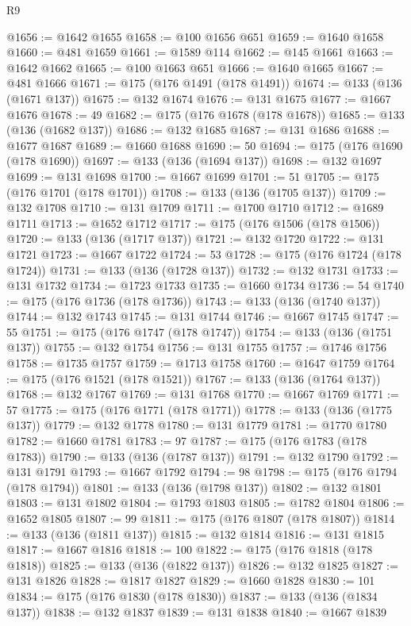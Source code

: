 \begin{lexlean}{R9}
\begin{coremodule}
@1656 := @1642 @1655
@1658 := @100 @1656 @651
@1659 := @1640 @1658
@1660 := @481 @1659
@1661 := @1589 @114
@1662 := @145 @1661
@1663 := @1642 @1662
@1665 := @100 @1663 @651
@1666 := @1640 @1665
@1667 := @481 @1666
@1671 := @175 (@176 @1491 (@178 @1491))
@1674 := @133 (@136 (@1671 @137))
@1675 := @132 @1674
@1676 := @131 @1675
@1677 := @1667 @1676
@1678 := 49
@1682 := @175 (@176 @1678 (@178 @1678))
@1685 := @133 (@136 (@1682 @137))
@1686 := @132 @1685
@1687 := @131 @1686
@1688 := @1677 @1687
@1689 := @1660 @1688
@1690 := 50
@1694 := @175 (@176 @1690 (@178 @1690))
@1697 := @133 (@136 (@1694 @137))
@1698 := @132 @1697
@1699 := @131 @1698
@1700 := @1667 @1699
@1701 := 51
@1705 := @175 (@176 @1701 (@178 @1701))
@1708 := @133 (@136 (@1705 @137))
@1709 := @132 @1708
@1710 := @131 @1709
@1711 := @1700 @1710
@1712 := @1689 @1711
@1713 := @1652 @1712
@1717 := @175 (@176 @1506 (@178 @1506))
@1720 := @133 (@136 (@1717 @137))
@1721 := @132 @1720
@1722 := @131 @1721
@1723 := @1667 @1722
@1724 := 53
@1728 := @175 (@176 @1724 (@178 @1724))
@1731 := @133 (@136 (@1728 @137))
@1732 := @132 @1731
@1733 := @131 @1732
@1734 := @1723 @1733
@1735 := @1660 @1734
@1736 := 54
@1740 := @175 (@176 @1736 (@178 @1736))
@1743 := @133 (@136 (@1740 @137))
@1744 := @132 @1743
@1745 := @131 @1744
@1746 := @1667 @1745
@1747 := 55
@1751 := @175 (@176 @1747 (@178 @1747))
@1754 := @133 (@136 (@1751 @137))
@1755 := @132 @1754
@1756 := @131 @1755
@1757 := @1746 @1756
@1758 := @1735 @1757
@1759 := @1713 @1758
@1760 := @1647 @1759
@1764 := @175 (@176 @1521 (@178 @1521))
@1767 := @133 (@136 (@1764 @137))
@1768 := @132 @1767
@1769 := @131 @1768
@1770 := @1667 @1769
@1771 := 57
@1775 := @175 (@176 @1771 (@178 @1771))
@1778 := @133 (@136 (@1775 @137))
@1779 := @132 @1778
@1780 := @131 @1779
@1781 := @1770 @1780
@1782 := @1660 @1781
@1783 := 97
@1787 := @175 (@176 @1783 (@178 @1783))
@1790 := @133 (@136 (@1787 @137))
@1791 := @132 @1790
@1792 := @131 @1791
@1793 := @1667 @1792
@1794 := 98
@1798 := @175 (@176 @1794 (@178 @1794))
@1801 := @133 (@136 (@1798 @137))
@1802 := @132 @1801
@1803 := @131 @1802
@1804 := @1793 @1803
@1805 := @1782 @1804
@1806 := @1652 @1805
@1807 := 99
@1811 := @175 (@176 @1807 (@178 @1807))
@1814 := @133 (@136 (@1811 @137))
@1815 := @132 @1814
@1816 := @131 @1815
@1817 := @1667 @1816
@1818 := 100
@1822 := @175 (@176 @1818 (@178 @1818))
@1825 := @133 (@136 (@1822 @137))
@1826 := @132 @1825
@1827 := @131 @1826
@1828 := @1817 @1827
@1829 := @1660 @1828
@1830 := 101
@1834 := @175 (@176 @1830 (@178 @1830))
@1837 := @133 (@136 (@1834 @137))
@1838 := @132 @1837
@1839 := @131 @1838
@1840 := @1667 @1839

\end{coremodule}
\end{lexlean}
